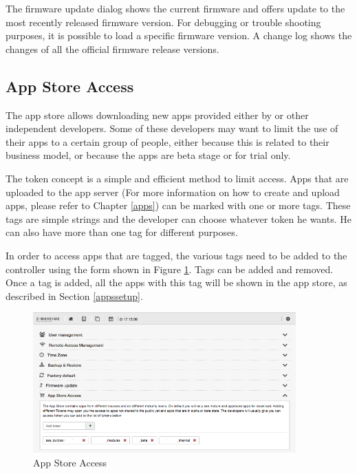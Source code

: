 The firmware update dialog shows the current firmware and offers update to the most recently 
released firmware version. For debugging or trouble shooting purposes, it is possible to load 
a specific firmware version. A change log shows the changes of all the official firmware 
release versions.

\subsection{App Store Access}

The app store allows downloading new apps provided either by \zwaveme or other independent 
developers. Some of these developers may want to limit the use of their apps to a 
certain group of people, either because this is related to their business model, or 
because the apps are beta stage or for trial only.

The token concept is a simple and efficient method to limit access. Apps that are uploaded 
to the app server (For more information on how to create and upload apps, please refer 
to Chapter \ref{apps}) can be marked with one or more tags. These tags are simple strings 
and the developer can choose whatever token he wants. He can also have more than one tag 
for different purposes.

In order to access apps that are tagged, the various tags need to be added to the 
controller using the form shown in Figure \ref{shui78}. Tags can be added and removed. 
Once a tag is added, all the apps with this tag will be shown in the app store, as 
described in Section \ref{appssetup}.


\begin{figure}
\begin{center}
\includegraphics[width=0.9\textwidth]{pngs/cap4/shui78.png}
\caption{App Store Access}
\label{shui78}
\end{center}
\end{figure}

